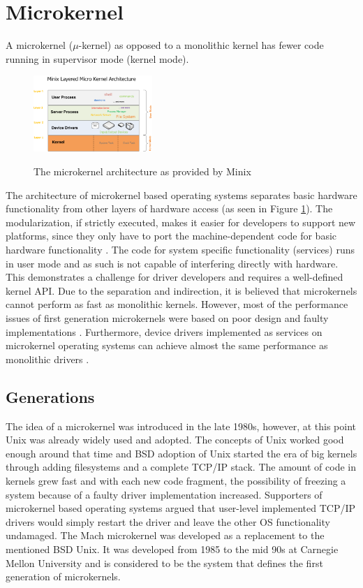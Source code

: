 \documentclass{acm_proc_article-sp}
\begin{document}
\section{Microkernel}
\label{sec:microkernel}
A microkernel ($\mu$-kernel) as opposed to a monolithic kernel has fewer code running in
supervisor mode (kernel mode).
\begin{figure}
\centering
\includegraphics[width=0.4\textwidth]{minixinternalstructure.png}
\label{fig:minixmicarch}
\caption{The microkernel architecture as provided by Minix \cite{minix}}
\end{figure}
The architecture of microkernel based operating systems separates basic
hardware functionality from other layers of hardware access (as seen in Figure \ref{fig:minixmicarch}).
The modularization, if strictly executed, makes it easier for developers to support new
platforms, since they only have to port the machine-dependent code for basic hardware functionality \cite{black92}.
The code for system specific functionality (services) runs in user mode and as such
is not capable of interfering directly with hardware.
This demonstrates a challenge for driver developers and requires a well-defined kernel API.
Due to the separation and indirection, it is believed that microkernels cannot perform as fast as
monolithic kernels.
However, most of the performance issues of first generation microkernels were based on poor design
and faulty implementations \cite{p237-liedtke}.
Furthermore, device drivers implemented as services on microkernel operating systems can achieve
almost the same performance as monolithic drivers \cite{uldd}.

\subsection{Generations}
The idea of a microkernel was introduced in the late 1980s, however, at this point Unix \cite{unix}
was already widely used and adopted.
The concepts of Unix worked good enough around that time and BSD \cite{bsd} adoption of Unix started
the era of big kernels through adding filesystems and a complete TCP/IP stack. %
The amount of code in kernels grew fast and with each new code fragment, the possibility of
freezing a system because of a faulty driver implementation increased.
Supporters of microkernel based operating systems argued that user-level implemented TCP/IP drivers
would simply restart the driver and leave the other OS functionality undamaged.
The Mach \cite{mach} microkernel was developed as a replacement to the mentioned BSD Unix.
It was developed from 1985 to the mid 90s at Carnegie Mellon University and is considered to be
the system that defines the first generation of microkernels.
\end{document}
